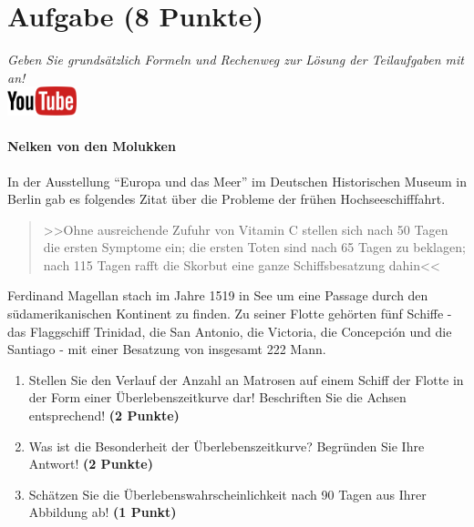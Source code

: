 \documentclass[a4paper, 9pt]{scrartcl}\usepackage[]{graphicx}\usepackage[]{xcolor}
\begin{document}
 
\clearpage

\section{Aufgabe \hfill (8 Punkte)}

\textit{Geben Sie grunds{\"a}tzlich Formeln und Rechenweg zur L{\"o}sung der
  Teilaufgaben mit an!} \\[1Ex]

\hfill\href{https://youtu.be/1B53cVFIU7Q}{\includegraphics[width =
  2cm]{img/youtube}} %
\hspace{2Ex}

\paragraph{Nelken von den Molukken}



In der Ausstellung "`Europa und das Meer"' im Deutschen Historischen Museum in
Berlin gab es folgendes Zitat {\"u}ber die Probleme der fr{\"u}hen Hochseeschifffahrt.

\begin{quote}
  >>Ohne ausreichende Zufuhr von Vitamin C stellen sich nach 50 Tagen die
  ersten Symptome ein; die ersten Toten sind nach 65 Tagen zu beklagen;
  nach 115 Tagen rafft die Skorbut eine ganze Schiffsbesatzung dahin<<
\end{quote}

Ferdinand Magellan stach im Jahre 1519 in See um eine Passage durch den
s{\"u}damerikanischen Kontinent zu finden. Zu seiner Flotte geh{\"o}rten
f{\"u}nf Schiffe - das Flaggschiff Trinidad, die San Antonio, die Victoria, die
Concepci{\'o}n und die Santiago - mit einer Besatzung von insgesamt
222 Mann. 

\begin{enumerate}
\item Stellen Sie den Verlauf der Anzahl an Matrosen auf einem Schiff der
  Flotte in der Form einer {\"U}berlebenszeitkurve dar! Beschriften Sie die
  Achsen entsprechend! \textbf{(2 Punkte)} 
\item Was ist die Besonderheit der Überlebenszeitkurve? Begründen Sie Ihre Antwort! \textbf{(2 Punkte)} 
\item Sch{\"a}tzen Sie die {\"U}berlebenswahrscheinlichkeit nach 90 Tagen
  aus Ihrer Abbildung ab! \textbf{(1 Punkt)} 
\end{enumerate}
\end{document}
